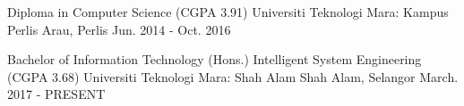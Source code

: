 

\begin{cventries}


  \cventry
    {Diploma in Computer Science (CGPA 3.91)}
    {Universiti Teknologi Mara: Kampus Perlis}
    {Arau, Perlis}
    {Jun. 2014 - Oct. 2016}
    {}

   \cventry
    {Bachelor of Information Technology (Hons.) Intelligent System Engineering (CGPA 3.68)}
    {Universiti Teknologi Mara: Shah Alam}
    {Shah Alam, Selangor}
    {March. 2017 - PRESENT}
    {}

\end{cventries}
